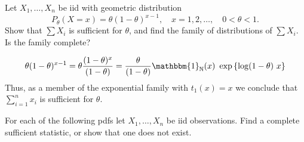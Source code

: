 \documentclass[12pt,letterpaper]{exam}
\begin{document}
\begin{questions}
\begin{solution}
	\end{solution}
	
	\setcounter{question}{16}
	\question 
	Let \(X_1, \ldots, X_n\) be iid with geometric distribution
	\[
		P_\theta(X=x) =\theta(1-\theta)^{x-1}, \quad x=1,2,\ldots, \quad 0<\theta<1.
	\]
	Show that \(\sum X_i\) is sufficient for \(\theta\), and find the family of distributions of \(\sum X_i\). 
	Is the family complete?
	
	\begin{solution}
		\begin{align*}
			\theta(1-\theta)^{x-1}
			=  \theta\frac{(1-\theta)^{x}}{(1-\theta)}
			=  \frac{\theta}{(1-\theta)} \mathbbm{1}_\mathbb{N}(x) \ \exp\left\{\log(1-\theta)\ x\right\}
		\end{align*}
		Thus, as a member of the exponential family with \(t_1(x) = x\) we conclude that \(\sum_{i=1}^{n}x_i\) is sufficient for \(\theta\).
	\end{solution}
	
	\setcounter{question}{19}
	\question 
	For each of the following pdfs let \(X_1, \ldots, X_n\) be iid observations. 
	Find a complete sufficient statistic, or show that one does not exist.
\end{questions}
\end{document}
